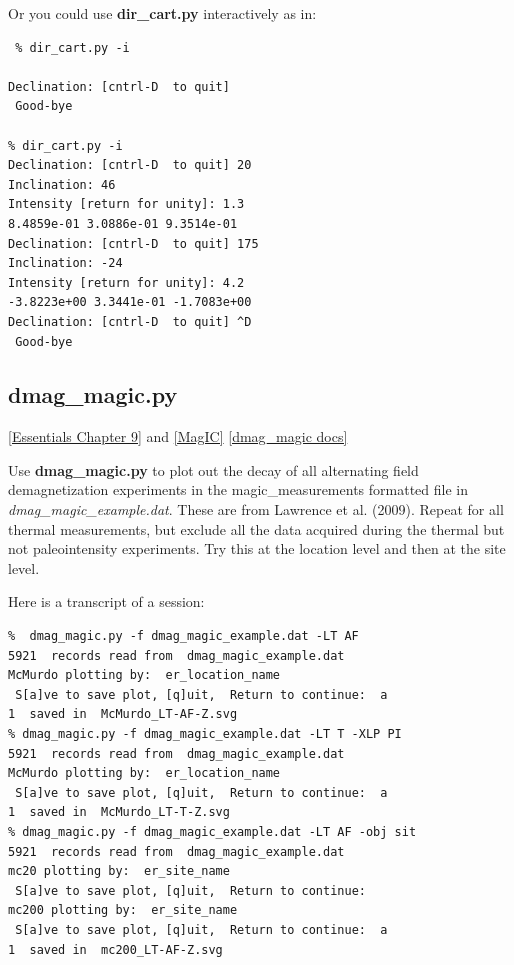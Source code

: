 \documentclass[11pt]{book}
\begin{document}
{{{ Or you could use {\bf dir\_cart.py} interactively as in:
 
 \begin{verbatim}
 % dir_cart.py -i

Declination: [cntrl-D  to quit] 
 Good-bye 

% dir_cart.py -i
Declination: [cntrl-D  to quit] 20
Inclination: 46
Intensity [return for unity]: 1.3
8.4859e-01 3.0886e-01 9.3514e-01
Declination: [cntrl-D  to quit] 175
Inclination: -24
Intensity [return for unity]: 4.2
-3.8223e+00 3.3441e-01 -1.7083e+00
Declination: [cntrl-D  to quit] ^D
 Good-bye 
\end{verbatim}

% 
% 
 \subsection{dmag\_magic.py}
  \href{http://magician.ucsd.edu/Essentials_2/WebBook2ch9.html#ch9}{[Essentials Chapter 9]} and \href{#MagIC}{[MagIC]}
  \href{http://earthref.org/PmagPy/pmagpydocs/dmag_magic-module.html}{[dmag\_magic docs]}
 
Use {\bf dmag\_magic.py} to plot out the decay of all alternating field demagnetization experiments in the magic\_measurements 
formatted file in {\it dmag\_magic\_example.dat}.   These are from Lawrence et al. (2009). \nocite{lawrence09}  Repeat for all thermal measurements, but exclude all the data acquired during the thermal but not  paleointensity experiments.   Try this at the location level and then at the site level. 

Here is a transcript of a session:

\begin{verbatim}
%  dmag_magic.py -f dmag_magic_example.dat -LT AF
5921  records read from  dmag_magic_example.dat
McMurdo plotting by:  er_location_name
 S[a]ve to save plot, [q]uit,  Return to continue:  a
1  saved in  McMurdo_LT-AF-Z.svg
% dmag_magic.py -f dmag_magic_example.dat -LT T -XLP PI
5921  records read from  dmag_magic_example.dat
McMurdo plotting by:  er_location_name
 S[a]ve to save plot, [q]uit,  Return to continue:  a
1  saved in  McMurdo_LT-T-Z.svg
% dmag_magic.py -f dmag_magic_example.dat -LT AF -obj sit
5921  records read from  dmag_magic_example.dat
mc20 plotting by:  er_site_name
 S[a]ve to save plot, [q]uit,  Return to continue:   
mc200 plotting by:  er_site_name
 S[a]ve to save plot, [q]uit,  Return to continue:  a
1  saved in  mc200_LT-AF-Z.svg

\end{verbatim}

}}}
\end{document}
